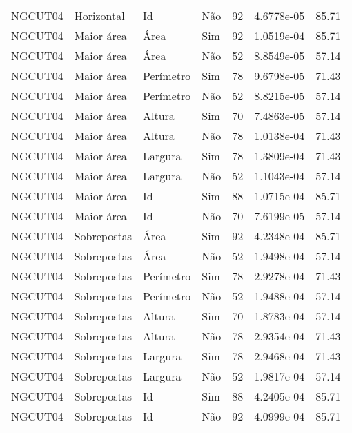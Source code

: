 \begin{tabular}{llllrrr}
NGCUT04   & Horizontal  & Id        & Não         & 92           & 4.6778e-05 & 85.71    \\
NGCUT04   & Maior área  & Área      & Sim         & 92           & 1.0519e-04 & 85.71    \\
NGCUT04   & Maior área  & Área      & Não         & 52           & 8.8549e-05 & 57.14    \\
NGCUT04   & Maior área  & Perímetro & Sim         & 78           & 9.6798e-05 & 71.43    \\
NGCUT04   & Maior área  & Perímetro & Não         & 52           & 8.8215e-05 & 57.14    \\
NGCUT04   & Maior área  & Altura    & Sim         & 70           & 7.4863e-05 & 57.14    \\
NGCUT04   & Maior área  & Altura    & Não         & 78           & 1.0138e-04 & 71.43    \\
NGCUT04   & Maior área  & Largura   & Sim         & 78           & 1.3809e-04 & 71.43    \\
NGCUT04   & Maior área  & Largura   & Não         & 52           & 1.1043e-04 & 57.14    \\
NGCUT04   & Maior área  & Id        & Sim         & 88           & 1.0715e-04 & 85.71    \\
NGCUT04   & Maior área  & Id        & Não         & 70           & 7.6199e-05 & 57.14    \\
NGCUT04   & Sobrepostas & Área      & Sim         & 92           & 4.2348e-04 & 85.71    \\
NGCUT04   & Sobrepostas & Área      & Não         & 52           & 1.9498e-04 & 57.14    \\
NGCUT04   & Sobrepostas & Perímetro & Sim         & 78           & 2.9278e-04 & 71.43    \\
NGCUT04   & Sobrepostas & Perímetro & Não         & 52           & 1.9488e-04 & 57.14    \\
NGCUT04   & Sobrepostas & Altura    & Sim         & 70           & 1.8783e-04 & 57.14    \\
NGCUT04   & Sobrepostas & Altura    & Não         & 78           & 2.9354e-04 & 71.43    \\
NGCUT04   & Sobrepostas & Largura   & Sim         & 78           & 2.9468e-04 & 71.43    \\
NGCUT04   & Sobrepostas & Largura   & Não         & 52           & 1.9817e-04 & 57.14    \\
NGCUT04   & Sobrepostas & Id        & Sim         & 88           & 4.2405e-04 & 85.71    \\
NGCUT04   & Sobrepostas & Id        & Não         & 92           & 4.0999e-04 & 85.71    \\
\hline
\end{tabular}